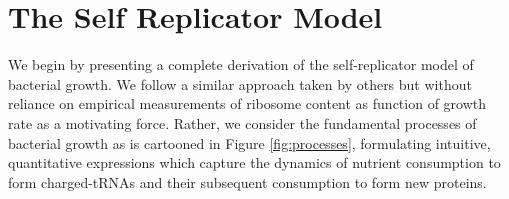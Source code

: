 \section*{The Self Replicator Model} 
We begin by presenting a complete derivation of the self-replicator model 
of bacterial growth. We follow a similar approach taken by others 
\cite{scott2010, scott2014, klumpp2013} but without reliance on empirical measurements 
of ribosome content as function of growth rate as a motivating force. Rather, 
we consider the fundamental processes of bacterial growth  as is cartooned in Figure \ref{fig:processes}, formulating intuitive, quantitative 
expressions which capture the dynamics of nutrient consumption to form charged-tRNAs 
and their subsequent consumption to form new proteins.

\begin{figure}
\end{figure}

